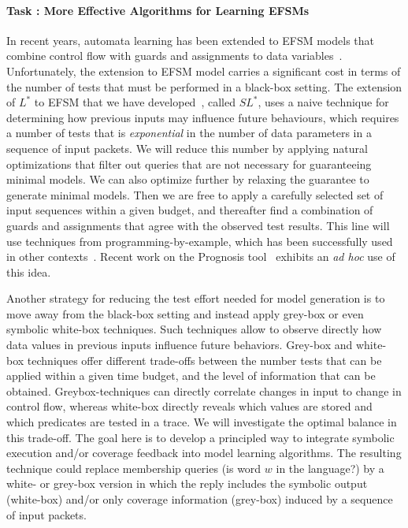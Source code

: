 \documentclass[11pt]{article}
\newcommand{\system}[1]{\mbox{\textsf{#1}}}
\newcounter{Task}
\newcommand{\task}[1]{\addtocounter{Task}{1}\paragraph{Task \theTask: #1}}
\newcommand{\myparagraph}{}
\let\myparagraph=\paragraph
\renewcommand{\paragraph}{\vspace{-3mm}\myparagraph}
\begin{document}
\task{More Effective Algorithms for Learning EFSMs}
In recent years, automata learning has been extended to EFSM models that
combine control flow with guards and assignments to data
variables~\cite{CasselHJS16,AJUV15}.
Unfortunately, the extension to EFSM model carries a significant cost in terms
of the number of tests that must be performed in a black-box setting.
The extension of $L^*$ to EFSM that we have developed~\cite{CasselHJS16}, called $SL^*$, uses a naive technique 
for determining how previous inputs may influence future behaviours, which
requires a number of tests that is \emph{exponential} in the number of data parameters in a
sequence of input packets.
We will reduce this number by applying natural optimizations that
filter out queries that are not necessary for guaranteeing minimal models.
 We can also optimize further by relaxing the guarantee to generate minimal models.
Then we are free to apply a carefully selected set of input sequences within a given budget, and thereafter find a combination of guards and assignments that agree with the observed test results. This line will use techniques from programming-by-example, which has been successfully used in other contexts~\cite{GulwaniPS17}. Recent work on the Prognosis tool~\cite{Prognosis@SIGCOMM-21} exhibits an \emph{ad hoc} use of this idea.

Another strategy for reducing the test effort needed for model generation is to move away from
the black-box setting and instead apply grey-box or even symbolic white-box techniques. Such techniques allow to
observe directly how data values in previous inputs influence future behaviors. Grey-box and white-box techniques offer
different trade-offs between the number tests that can be applied within a given time budget, and the level of information that
can be obtained.
Greybox-techniques can directly correlate changes in input to change in
control flow, whereas white-box directly reveals which values are stored and which predicates are tested in a trace.
We will investigate the optimal balance in this trade-off.
The goal here is to develop a principled way to integrate symbolic execution and/or coverage feedback into model learning algorithms.
The resulting technique could replace membership queries (is word $w$ in the language?) by a white- or grey-box
version in which the reply includes the symbolic output (white-box) and/or only coverage information (grey-box) induced by a
sequence of input packets.
\end{document}
